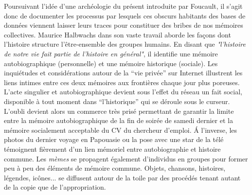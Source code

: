 Poursuivant l{\textquoteright}idée d{\textquoteright}une archéologie du présent introduite par Foucault, il s{\textquoteright}agit donc de documenter les processus par lesquels ces obscurs habitants des bases de données viennent laisser leurs traces pour constituer des bribes de nos mémoires collectives. Maurice Halbwachs dans son vaste travail aborde les fa\c{c}ons dont l{\textquoteright}histoire structure l{\textquoteright}être-ensemble des groupes humains. En disant que \textit{"l'histoire de notre vie fait partie de l'histoire en général"}\citep{Halbwachs1947}, il identifie une mémoire autobiographique (personnelle) et une mémoire historique (sociale). Les inquiétudes et considérations autour de la {\textquotedblleft}vie privée{\textquotedblright} sur Internet illustrent les liens intimes entre ces deux mémoires aux frontières chaque jour plus poreuses. L{\textquoteright}acte singulier et autobiographique devient sous l{\textquoteright}effet du réseau un fait social, disponible à tout moment dans {\textquotedblleft}l{\textquoteright}historique{\textquotedblright} qui se déroule sous le curseur. L{\textquoteright}oubli devient alors un commerce très prisé permettant de garantir la limite entre la mémoire autobiographique de la fin de soirée de samedi dernier et la mémoire socialement acceptable du CV du chercheur d{\textquoteright}emploi. \'A l{\textquoteright}inverse, les photos du dernier voyage en Papouasie ou la pose avec une star de la télé témoignent fièrement d{\textquoteright}un lien mémoriel entre autobiographie et histoire commune. Les \textit{mèmes} se propagent également d{\textquoteright}individus en groupes pour former peu à peu des éléments de mémoire commune. Objets, chansons, histoires, légendes, icônes... se diffusent autour de la toile par des procédés tenant autant de la copie que de l{\textquoteright}appropriation. 


